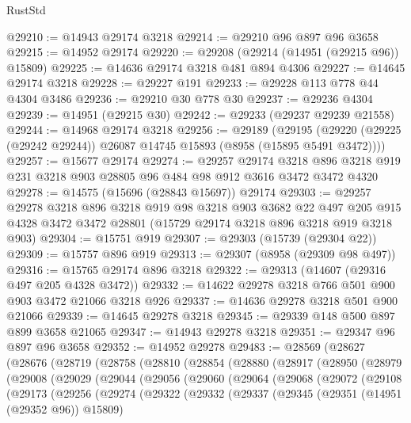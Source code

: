 \begin{lexlean}{RustStd}
\begin{coremodule}
@29210 := @14943 @29174 @3218
@29214 := @29210 @96 @897 @96 @3658
@29215 := @14952 @29174
@29220 := @29208 (@29214 (@14951 (@29215 @96)) @15809)
@29225 := @14636 @29174 @3218 @481 @894 @4306
@29227 := @14645 @29174 @3218
@29228 := @29227 @191
@29233 := @29228 @113 @778 @44 @4304 @3486
@29236 := @29210 @30 @778 @30
@29237 := @29236 @4304
@29239 := @14951 (@29215 @30)
@29242 := @29233 (@29237 @29239 @21558)
@29244 := @14968 @29174 @3218
@29256 := @29189
    (@29195 (@29220 (@29225 (@29242 @29244)) @26087 @14745 @15893 (@8958 (@15895 @5491 @3472))))
@29257 := @15677 @29174
@29274 := @29257
    @29174
    @3218
    @896
    @3218
    @919
    @231
    @3218
    @903
    @28805
    @96
    @484
    @98
    @912
    @3616
    @3472
    @3472
    @4320
@29278 := @14575 (@15696 (@28843 @15697)) @29174
@29303 := @29257
    @29278
    @3218
    @896
    @3218
    @919
    @98
    @3218
    @903
    @3682
    @22
    @497
    @205
    @915
    @4328
    @3472
    @3472
    @28801
    (@15729 @29174 @3218 @896 @3218 @919 @3218 @903)
@29304 := @15751 @919
@29307 := @29303 (@15739 (@29304 @22))
@29309 := @15757 @896 @919
@29313 := @29307 (@8958 (@29309 @98 @497))
@29316 := @15765 @29174 @896 @3218
@29322 := @29313 (@14607 (@29316 @497 @205 @4328 @3472))
@29332 := @14622 @29278 @3218 @766 @501 @900 @903 @3472 @21066 @3218 @926
@29337 := @14636 @29278 @3218 @501 @900 @21066
@29339 := @14645 @29278 @3218
@29345 := @29339 @148 @500 @897 @899 @3658 @21065
@29347 := @14943 @29278 @3218
@29351 := @29347 @96 @897 @96 @3658
@29352 := @14952 @29278
@29483 := @28569
    (@28627
      (@28676
        (@28719
          (@28758
            (@28810
              (@28854
                (@28880
                  (@28917
                    (@28950
                      (@28979
                        (@29008
                          (@29029
                            (@29044
                              (@29056
                                (@29060
                                  (@29064
                                    (@29068
                                      (@29072
                                        (@29108
                                          (@29173
                                            (@29256
                                              (@29274
                                                (@29322
                                                  (@29332
                                                    (@29337
                                                      (@29345
                                                        (@29351 (@14951 (@29352 @96)) @15809)

\end{coremodule}
\end{lexlean}
